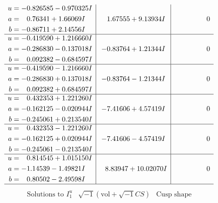 \documentclass[1p]{elsarticle_modified}
\theoremstyle{definition}
\newcommand{\I}{\sqrt{-1}}
\begin{document}
$$\begin{array}{c|c|c}
\begin{aligned}
u &= -0.826585 - 0.970325 I \\
a &= \phantom{-}0.76341 + 1.66069 I \\
b &= -0.86711 + 2.14556 I\end{aligned}
 & \phantom{-}1.67555 + 9.13934 I & \phantom{-0.000000 } 0 \\ \hline\begin{aligned}
u &= -0.419590 + 1.216660 I \\
a &= -0.286830 - 0.137018 I \\
b &= \phantom{-}0.092382 - 0.684597 I\end{aligned}
 & -0.83764 + 1.21344 I & \phantom{-0.000000 } 0 \\ \hline\begin{aligned}
u &= -0.419590 - 1.216660 I \\
a &= -0.286830 + 0.137018 I \\
b &= \phantom{-}0.092382 + 0.684597 I\end{aligned}
 & -0.83764 - 1.21344 I & \phantom{-0.000000 } 0 \\ \hline\begin{aligned}
u &= \phantom{-}0.432353 + 1.221260 I \\
a &= -0.162125 - 0.020944 I \\
b &= -0.245061 + 0.213540 I\end{aligned}
 & -7.41606 + 4.57419 I & \phantom{-0.000000 } 0 \\ \hline\begin{aligned}
u &= \phantom{-}0.432353 - 1.221260 I \\
a &= -0.162125 + 0.020944 I \\
b &= -0.245061 - 0.213540 I\end{aligned}
 & -7.41606 - 4.57419 I & \phantom{-0.000000 } 0 \\ \hline\begin{aligned}
u &= \phantom{-}0.814545 + 1.015150 I \\
a &= -1.14539 - 1.49821 I \\
b &= \phantom{-}0.80502 - 2.49598 I\end{aligned}
 & \phantom{-}8.83947 + 10.02070 I & \phantom{-0.000000 } 0\\
 \hline 
 \end{array}$$\newpage$$\begin{array}{c|c|c}  
\text{Solutions to }I^u_{1}& \I (\text{vol} + \sqrt{-1}CS) & \text{Cusp shape}\\
 \hline 
\begin{aligned}

\end{aligned}
\end{array}$$
\end{document}
